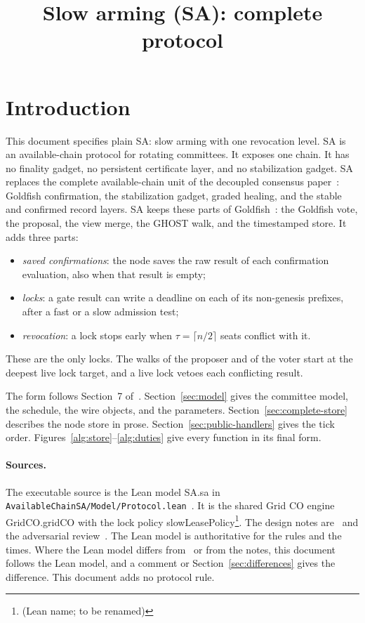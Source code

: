 \documentclass{article}
\title{Slow arming (SA): complete protocol}
\author{}
\date{}
\theoremstyle{plain}
\theoremstyle{definition}
\theoremstyle{remark}
\newcommand{\DC}[1]{\cite[\S#1]{DC}}
\newcommand{\lean}[1]{\textsf{#1}}
\begin{document}
\maketitle

\section{Introduction}\label{sec:intro}

This document specifies plain SA: slow arming with one revocation level.
SA is an available-chain protocol for rotating committees.  It exposes
one chain.  It has no finality gadget, no persistent certificate layer,
and no stabilization gadget.  SA replaces the complete available-chain
unit of the decoupled consensus paper~\cite{DC}: Goldfish confirmation,
the stabilization gadget, graded healing, and the stable and confirmed
record layers.  SA keeps these parts of Goldfish~\DC{2}: the Goldfish
vote, the proposal, the view merge, the GHOST walk, and the timestamped
store.  It adds three parts:
\begin{itemize}[nosep]
\item \emph{saved confirmations}: the node saves the raw result of each
  confirmation evaluation, also when that result is empty;
\item \emph{locks}: a gate result can write a deadline on each of its
  non-genesis prefixes, after a fast or a slow admission test;
\item \emph{revocation}: a lock stops early when $\tau=\lceil n/2\rceil$
  seats conflict with it.
\end{itemize}
These are the only locks.  The walks of the proposer and of the voter
start at the deepest live lock target, and a live lock vetoes each
conflicting result.

The form follows Section~7 of~\cite{DC}.  Section~\ref{sec:model} gives
the committee model, the schedule, the wire objects, and the parameters.
Section~\ref{sec:complete-store} describes the node store in prose.
Section~\ref{sec:public-handlers} gives the tick order.
Figures~\ref{alg:store}--\ref{alg:duties} give every function in its
final form.

\paragraph{Sources.}
The executable source is the Lean model \lean{SA.sa}
in \nolinkurl{AvailableChainSA/Model/Protocol.lean}~\cite{Lean}.  It is
the shared Grid CO engine \lean{GridCO.gridCO} with the lock policy
\lean{slowLeasePolicy}\footnote{(Lean name; to be renamed)}.  The design notes are~\cite{SA} and the
adversarial review~\cite{RT}.  The Lean model is authoritative for the
rules and the times.  Where the Lean model differs from~\cite{DC} or
from the notes, this document follows the Lean model, and a comment or
Section~\ref{sec:differences} gives the difference.  This document adds
no protocol rule.
\end{document}
